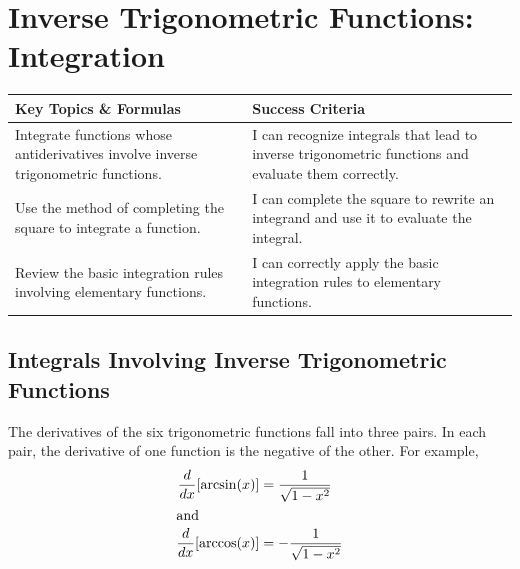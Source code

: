 \documentclass[12pt, letterpaper]{article}
\begin{document}
\section{Inverse Trigonometric Functions: Integration}
\begin{objectives}
    \renewcommand{\arraystretch}{1.5} %
    \begin{tabularx}{\textwidth}{@{} >{\raggedright\arraybackslash}X >{\raggedright\arraybackslash}X @{}}
        
        \textbf{Key Topics \& Formulas} & \textbf{Success Criteria} \\ 
        \midrule[1.5pt] %
        
        Integrate functions whose antiderivatives involve inverse trigonometric functions.
        & I can recognize integrals that lead to inverse trigonometric functions and evaluate them correctly. \\
        \midrule %
        
        Use the method of completing the square to integrate a function.
        & I can complete the square to rewrite an integrand and use it to evaluate the integral. \\
        \midrule

        Review the basic integration rules involving elementary functions.
        & I can correctly apply the basic integration rules to elementary functions.
    \end{tabularx}
\end{objectives}

\subsection{Integrals Involving Inverse Trigonometric Functions}

The derivatives of the six trigonometric functions fall into three pairs. In each pair, the derivative of one function is the negative of the other. For example,
\begin{align*}
    \displaystyle \frac{d}{dx} [\arcsin(x)] &= \frac{1}{\sqrt{1-x^2}} \\
    \intertext{and}
    \displaystyle \frac{d}{dx} [\arccos(x)] &= -\frac{1}{\sqrt{1-x^2}} 
\end{align*}
\end{document}
